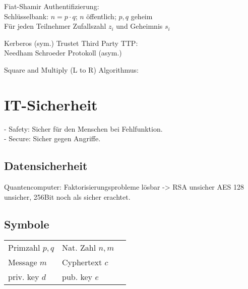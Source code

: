 \documentclass[fs]{latex4ei}
\begin{document}
\begin{multicols}{4}
Fiat-Shamir Authentifizierung:\\
Schlüsselbank: $n = p \cdot q$; $n$ öffentlich; $p,q$ geheim\\
Für jeden Teilnehmer Zufallszahl $z_i$ und Geheimnis $s_i$


Kerberos (sym.)
Trustet Third Party TTP:\\

Needham Schroeder Protokoll (asym.)



Square and Multiply (L to R) Algorithmus:\\



\section{IT-Sicherheit}
	- Safety: Sicher für den Menschen bei Fehlfunktion.\\
	- Secure: Sicher gegen Angriffe.\\
	
	\subsection{Datensicherheit}
	
	

	Quantencomputer: Faktorisierungsprobleme lösbar -> RSA unsicher
					AES 128 unsicher, 256Bit noch als sicher erachtet.\\





	\subsection{Symbole}
	\begin{tabular}{lll}
		Primzahl $p,q$ & Nat. Zahl $n,m$\\
		Message $m$ & Cyphertext $c$\\
		priv. key $d$ & pub. key $e$\\
	\end{tabular}




\end{multicols}



\end{document}
